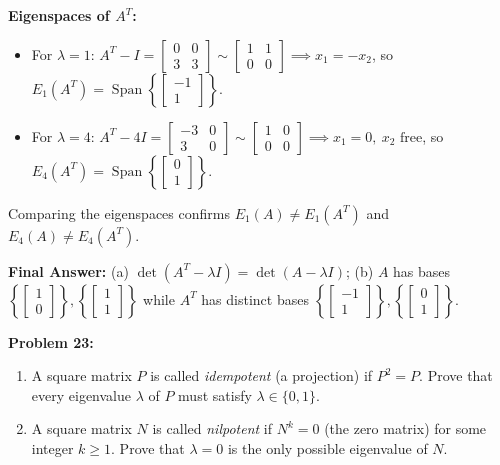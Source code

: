 \documentclass[11pt, letterpaper]{article}
\theoremstyle{definition}
\theoremstyle{remark}
\begin{document}
\begin{enumerate}[label=(\alph*)]
    \textbf{Eigenspaces of $A^T$:}
    \begin{itemize}
        \item For $\lambda = 1$: $A^T - I = \begin{bmatrix} 0 & 0 \\ 3 & 3 \end{bmatrix} \sim \begin{bmatrix} 1 & 1 \\ 0 & 0 \end{bmatrix} \implies x_1 = -x_2$, so $E_1(A^T) = \operatorname{Span}\left\{ \begin{bmatrix} -1 \\ 1 \end{bmatrix} \right\}$.
        \item For $\lambda = 4$: $A^T - 4I = \begin{bmatrix} -3 & 0 \\ 3 & 0 \end{bmatrix} \sim \begin{bmatrix} 1 & 0 \\ 0 & 0 \end{bmatrix} \implies x_1 = 0,\ x_2 \text{ free}$, so $E_4(A^T) = \operatorname{Span}\left\{ \begin{bmatrix} 0 \\ 1 \end{bmatrix} \right\}$.
    \end{itemize}
    Comparing the eigenspaces confirms $E_1(A) \neq E_1(A^T)$ and $E_4(A) \neq E_4(A^T)$.
\end{enumerate}
\textbf{Final Answer:} (a) $\det(A^T - \lambda I) = \det(A - \lambda I)$; (b) $A$ has bases $\left\{\begin{bmatrix} 1 \\ 0 \end{bmatrix}\right\}, \left\{\begin{bmatrix} 1 \\ 1 \end{bmatrix}\right\}$ while $A^T$ has distinct bases $\left\{\begin{bmatrix} -1 \\ 1 \end{bmatrix}\right\}, \left\{\begin{bmatrix} 0 \\ 1 \end{bmatrix}\right\}$.

\vspace{0.4em}
\textbf{Problem 23:}
\begin{enumerate}[label=(\alph*)]
    \item A square matrix $P$ is called \emph{idempotent} (a projection) if $P^2 = P$. Prove that every eigenvalue $\lambda$ of $P$ must satisfy $\lambda \in \{0, 1\}$.
    \item A square matrix $N$ is called \emph{nilpotent} if $N^k = 0$ (the zero matrix) for some integer $k \ge 1$. Prove that $\lambda = 0$ is the only possible eigenvalue of $N$.
\end{enumerate}
\end{document}
